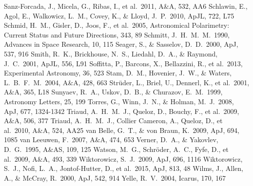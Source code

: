 \documentclass[iop]{emulateapj}
\begin{document}
\begin{thebibliography}{99}
 Sanz-Forcada, J., Micela, G., Ribas, I., et al.\ 2011, A\&A, 532, AA6 
 Schlawin, E., Agol, E., Walkowicz, L.~M., Covey, K., \& Lloyd, J.~P.\ 2010, ApJL, 722, L75
 Schmid, H.~M., Gisler, D., Joos, F., et al.\ 2005, Astronomical Polarimetry: Current Status and Future Directions, 343, 89
 Schmitt, J.~H.~M.~M.\ 1990, Advances in Space Research, 10, 115 
 Seager, S., \& Sasselov, D.~D.\ 2000, ApJ, 537, 916
 Smith, R.~K., Brickhouse, N.~S., Liedahl, D.~A., \& Raymond, J.~C.\ 2001, ApJL, 556, L91 
 Soffitta, P., Barcons, X., Bellazzini, R., et al.\ 2013, Experimental Astronomy, 36, 523
 Stam, D.~M., Hovenier, J.~W., \& Waters, L.~B.~F.~M.\ 2004, A\&A, 428, 663 
 Str{\"u}der, L., Briel, U., Dennerl, K., et al.\ 2001, A\&A, 365, L18 
 Sunyaev, R.~A., Uskov, D.~B., \& Churazov, E.~M.\ 1999, Astronomy Letters, 25, 199
 Torres, G., Winn, J.~N., \& Holman, M.~J.\ 2008, ApJ, 677, 1324-1342 
 Triaud, A.~H.~M.~J., Queloz, D., Bouchy, F., et al.\ 2009, A\&A, 506, 377 
 Triaud, A.~H.~M.~J., Collier Cameron, A., Queloz, D., et al.\ 2010, A\&A, 524, AA25 
 van Belle, G.~T., \& von Braun, K.\ 2009, ApJ, 694, 1085 
 van Leeuwen, F.\ 2007, A\&A, 474, 653 
 Verner, D.~A., \& Yakovlev, D.~G.\ 1995, A\&AS, 109, 125 
 Watson, M.~G., Schr{\"o}der, A.~C., Fyfe, D., et al.\ 2009, A\&A, 493, 339 
 Wiktorowicz, S.~J.\ 2009, ApJ, 696, 1116
 Wiktorowicz, S.~J., Nofi, L.~A., Jontof-Hutter, D., et al.\ 2015, ApJ, 813, 48 
 Wilms, J., Allen, A., \& McCray, R.\ 2000, ApJ, 542, 914
 Yelle, R.~V.\ 2004, Icarus, 170, 167 
\end{thebibliography}
\end{document}
